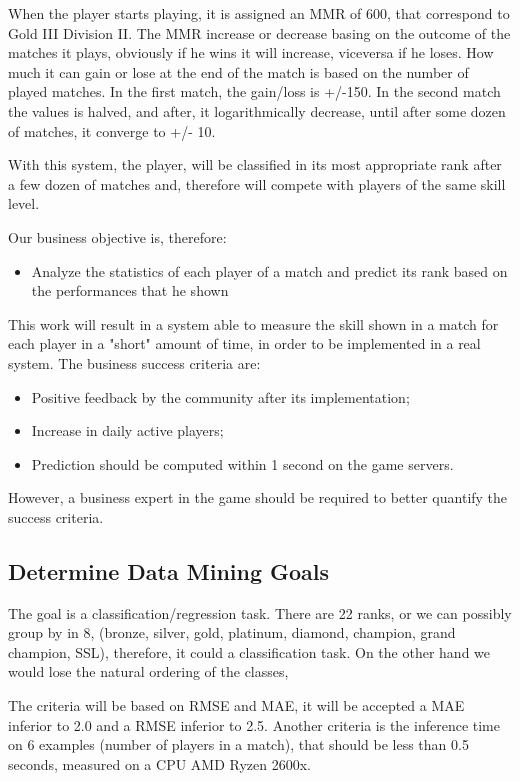 When the player starts playing, it is assigned an MMR of 600, that correspond to Gold III Division II. The MMR increase or decrease basing on the outcome of the matches it plays, obviously if he wins it will increase, viceversa if he loses. How much it can gain or lose at the end of the match is based on the number of played matches. In the first match, the gain/loss is +/-150. In the second match the values is halved, and after, it logarithmically decrease, until after some dozen of matches, it converge to +/- 10.

With this system, the player, will be classified in its most appropriate rank after a few dozen of matches and, therefore will compete with players of the same skill level.

Our business objective is, therefore:
\begin{itemize}
    \item Analyze the statistics of each player of a match and predict its rank based on the performances that he shown
\end{itemize}


This work will result in a system able to measure the skill shown in a match for each player in a "short" amount of time, in order to be implemented in a real system.
The business success criteria are:
\begin{itemize}
    \item Positive feedback by the community after its implementation;
    \item Increase in daily active players;
    \item Prediction should be computed within 1 second on the game servers.
\end{itemize}

However, a business expert in the game should be required to better quantify the success criteria.

\subsection{Determine Data Mining Goals}
\label{sec:min_goal}
The goal is a classification/regression task. There are 22 ranks, or we can possibly group by in 8, (bronze, silver, gold, platinum, diamond, champion, grand champion, SSL), therefore, it could a classification task. On the other hand we would lose the natural ordering of the classes, 

The criteria will be based on RMSE and MAE, it will be accepted a MAE inferior to 2.0 and a RMSE inferior to 2.5. 
Another criteria is the inference time on 6 examples (number of players in a match), that should be less than 0.5 seconds, measured on a CPU AMD Ryzen 2600x.
